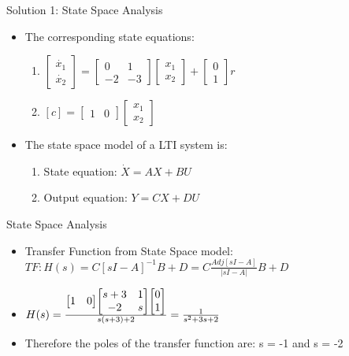 \documentclass{beamer}
\begin{document}
\begin{frame}{Solution 1: State Space Analysis}
\begin{itemize}
    \item The corresponding state equations:\vspace{5}
    \begin{enumerate}
        \item $\begin{bmatrix}
\dot{x_1}\\
\dot{x_2}
\end{bmatrix} = \begin{bmatrix}
0 & 1\\
-2 & -3
\end{bmatrix} \begin{bmatrix}
x_1\\
x_2
\end{bmatrix} + \begin{bmatrix}
0\\
1
\end{bmatrix}r$
        \item $ [c] = \begin{bmatrix}
1 & 0
\end{bmatrix}\begin{bmatrix}
x_1\\
x_2
\end{bmatrix}$
    \end{enumerate}
    \item The state space model of a LTI system is:
    \begin{enumerate}
        \item State equation: $\dot{X} = AX + BU$
        \item Output equation: $Y = CX + DU$ 
    \end{enumerate}
\end{itemize}

\end{frame}

\begin{frame}{State Space Analysis}
    \begin{itemize}
        \item Transfer Function from State Space model: $TF: H(s) = C[sI-A]^{-1}B + D = C\frac{Adj[sI-A]}{|sI-A|}B + D$
        \item $H(s) = \frac{\begin{bmatrix}
        1 & 0
        \end{bmatrix}\begin{bmatrix}
        s+3 & 1\\
        -2 & s
        \end{bmatrix}\begin{bmatrix}
        0\\
        1
        \end{bmatrix}}{s(s+3) + 2} = \LARGE{\frac{1}{s^{2}+3s+2}}$
        \item Therefore the poles of the transfer function are: s = -1 and s = -2
    \end{itemize}
\end{frame}
\end{document}
